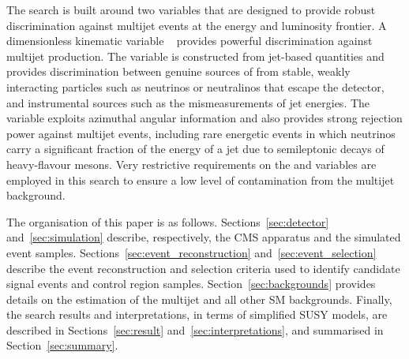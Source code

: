 The search is built around two variables that are designed to provide
robust discrimination against multijet events at the energy and
luminosity frontier. A dimensionless kinematic variable
\alphat~\cite{Randall:2008rw, RA1Paper} provides powerful
discrimination against multijet production. The \alphat variable is
constructed from jet-based quantities and provides discrimination
between genuine sources of \ptvecmiss from stable, weakly interacting
particles such as neutrinos or neutralinos that escape the detector,
and instrumental sources such as the mismeasurements of jet energies.
The \bdphi~\cite{RA1Paper} variable exploits azimuthal angular
information and also provides strong rejection power against multijet
events, including rare energetic events in which neutrinos carry a
significant fraction of the energy of a jet due to semileptonic decays
of heavy-flavour mesons. Very restrictive requirements on the \alphat
and \dphi variables are employed in this search to ensure a low level
of contamination from the multijet background.

The organisation of this paper is as
follows. Sections~\ref{sec:detector} and~\ref{sec:simulation}
describe, respectively, the CMS apparatus and the simulated event
samples. Sections~\ref{sec:event_reconstruction}
and~\ref{sec:event_selection} describe the event reconstruction and
selection criteria used to identify candidate signal events and
control region samples. Section~\ref{sec:backgrounds} provides details
on the estimation of the multijet and all other SM
backgrounds. Finally, the search results and interpretations, in terms
of simplified SUSY models, are described in
Sections~\ref{sec:result} and~\ref{sec:interpretations}, and
summarised in Section~\ref{sec:summary}.


